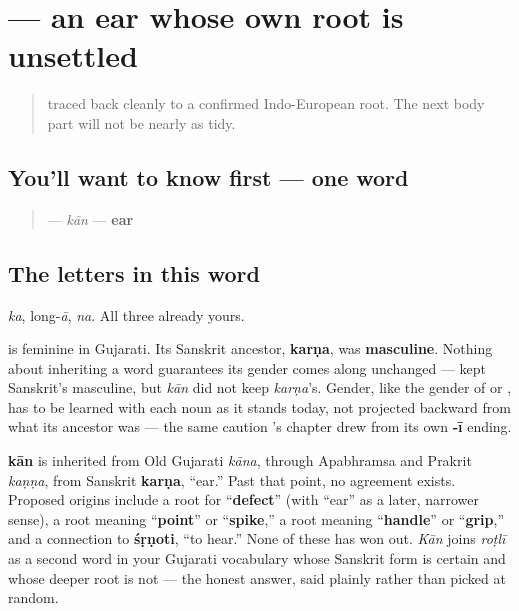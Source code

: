 \section[\texorpdfstring{\gu{કાન} (kān)}{કાન (kān)}]{ — an ear whose own root is unsettled}

\label{lesson:GU-C12-kaan}



\begin{quote}
\textbf{} traced back cleanly to a confirmed Indo-European root. The next body part will not be nearly as tidy.
\end{quote}

\subsection*{You'll want to know first — one word}
\begin{quote}
\textbf{} — \emph{kān} — \textbf{ear}
\end{quote}

\subsection*{The letters in this word}
\textbf{} \emph{ka}, \textbf{} long-\emph{ā}, \textbf{} \emph{na}. All three already yours.

\begin{grammarlens}[title={Grammar Lens: a gender that changed on the way here}]
\textbf{} is feminine in Gujarati. Its Sanskrit ancestor, \textbf{karṇa}, was \textbf{masculine}. Nothing about inheriting a word guarantees its gender comes along unchanged — \textbf{} kept Sanskrit's masculine, but \emph{kān} did not keep \emph{karṇa}'s. Gender, like the gender of \textbf{} or \textbf{}, has to be learned with each noun as it stands today, not projected backward from what its ancestor was — the same caution \textbf{}'s chapter drew from its own \textbf{-ī} ending.
\end{grammarlens}

\begin{cousinweb}
\textbf{kān} is inherited from Old Gujarati \emph{kāna}, through Apabhramsa and Prakrit \emph{kaṇṇa}, from Sanskrit \textbf{karṇa}, \textquotedblleft{}ear.\textquotedblright{} Past that point, no agreement exists. Proposed origins include a root for \textquotedblleft{}\textbf{defect}\textquotedblright{} (with \textquotedblleft{}ear\textquotedblright{} as a later, narrower sense), a root meaning \textquotedblleft{}\textbf{point}\textquotedblright{} or \textquotedblleft{}\textbf{spike},\textquotedblright{} a root meaning \textquotedblleft{}\textbf{handle}\textquotedblright{} or \textquotedblleft{}\textbf{grip},\textquotedblright{} and a connection to \textbf{śṛṇoti}, \textquotedblleft{}to hear.\textquotedblright{} None of these has won out. \emph{Kān} joins \emph{roṭlī} as a second word in your Gujarati vocabulary whose Sanskrit form is certain and whose deeper root is not — the honest answer, said plainly rather than picked at random.
\end{cousinweb}

